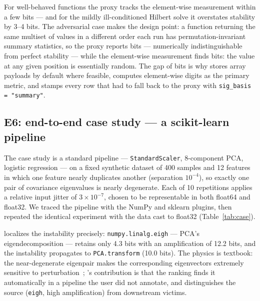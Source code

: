 For well-behaved functions the proxy tracks the element-wise measurement
within a few bits --- and for the mildly ill-conditioned Hilbert solve it
overstates stability by 3--4 bits. The adversarial case makes the design
point: a function returning the same multiset of values in a different
order each run has permutation-invariant summary statistics, so the proxy
reports \permSummaryBits{} bits --- numerically indistinguishable from
perfect stability --- while the element-wise measurement finds
\permElementBits{} bits: the value at any given position is essentially
random. The gap of \permOptimismBits{} bits is why \pyt{} stores array
payloads by default where feasible, computes element-wise digits as the
primary metric, and stamps every row that had to fall back to the proxy
with \texttt{sig\_basis = "summary"}.

\subsection{E6: end-to-end case study --- a scikit-learn pipeline}
\label{sec:eval-case}

The case study is a standard pipeline --- \texttt{StandardScaler},
8-component PCA, logistic regression --- on a fixed synthetic dataset of
400 samples and 12 features in which one feature nearly duplicates
another (separation $10^{-4}$), so exactly one pair of covariance
eigenvalues is nearly degenerate. Each of 10 repetitions applies a
relative input jitter of $3\times10^{-7}$, chosen to be representable in
both float64 and float32. We traced the pipeline with the NumPy and
sklearn plugins, then repeated the identical experiment with the data
cast to float32 (Table~\ref{tab:case}).

\begin{table}[t]
  \centering\small
  \caption{E6 --- scikit-learn case study (10 runs, element-wise basis):
  minimum and median output significant bits per traced call, float64
  vs.\ float32 pipeline, and float64 amplification. Rows without values
  are calls whose outputs are non-numeric (fitted-estimator objects).}
  \label{tab:case}
  
\end{table}

\pyt{} localizes the instability precisely: \texttt{numpy.linalg.eigh}
--- PCA's eigendecomposition --- retains only 4.3 bits with an
amplification of 12.2 bits, and the instability propagates to
\texttt{PCA.transform} (10.0 bits). The physics is textbook: the
near-degenerate eigenpair makes the corresponding eigenvectors extremely
sensitive to perturbation~\citep{higham2002accuracy}; \pyt{}'s
contribution is that the ranking finds it automatically in a pipeline the
user did not annotate, and distinguishes the source (\texttt{eigh},
high amplification) from downstream victims.

